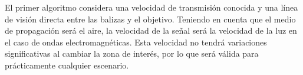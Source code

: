 




El primer algoritmo considera una velocidad de transmisión conocida y una línea de visión directa entre las balizas y el objetivo.
Teniendo en cuenta que el medio de propagación será el aire, la velocidad de la señal será la velocidad de la luz en el caso de ondas electromagnéticas.
Esta velocidad no tendrá variaciones significativas al cambiar la zona de interés, por lo que será válida para prácticamente cualquier escenario.

